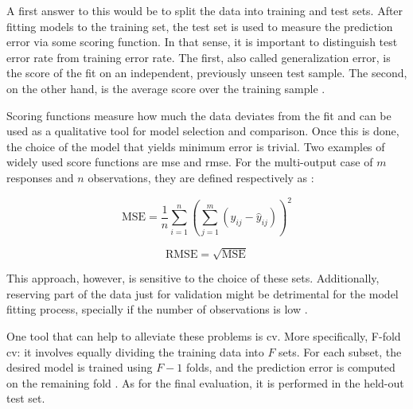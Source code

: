 A first answer to this would be to split the data into training and test sets. After fitting models to the training set, the test set is used to measure the prediction error via some scoring function. In that sense, it is important to distinguish test error rate from training error rate. The first, also called generalization error, is the score of the fit on an independent, previously unseen test sample. The second, on the other hand, is the average score over the training sample \parencite{friedman2001}.

Scoring functions measure how much the data deviates from the fit and can be used as a qualitative tool for model selection and comparison.  Once this is done, the choice of the model that yields minimum error is trivial. Two examples of widely used score functions are \acrfull{mse} and \acrfull{rmse}. For the multi-output case of $m$ responses and $n$ observations, they are defined respectively as :

\begin{equation} 
	\label{eqn:mse}
	\text{MSE} = \frac{1}{n}  \sum_{i=1}^{n} \left(\sum_{j=1}^{m}(y_{ij} - \hat{y}_{ij})\right)^2
\end{equation}

\begin{equation} 
	\label{eqn:rmse}
	\text{RMSE} = \sqrt{\text{MSE}}
\end{equation}
 
This approach, however,  is sensitive to the choice of these sets. Additionally, reserving part of the data just for validation might be detrimental for the model fitting process, specially if the number of observations is low \parencite{james2013introduction}.

One tool that can help to alleviate these problems is \acrfull{cv}. More specifically,  F-fold \acrshort{cv}: it involves equally dividing the training data into $F$ sets. For each subset, the desired model is trained using $F-1$ folds, and the prediction error is computed on the remaining fold \parencite{friedman2001}. As for the final evaluation, it is performed in the held-out test set.